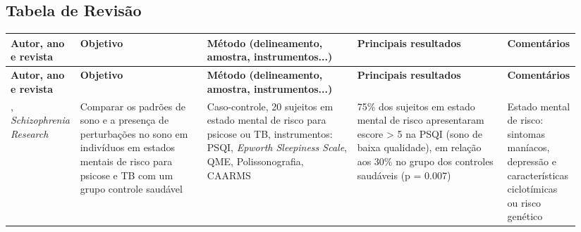 \documentclass[chapter=TITLE,
               oneside,
               12pt,
               a4paper,
               english,
               brazil]{abntex2}    %
\begin{document}
\begin{anexosenv}

    \begin{landscape}

    \chapter{Tabela de Revisão}
    \label{sec:tabelarevisao}
    
            \noindent
            \begin{longtabu} to 
            \toprule
            \textbf{Autor, ano e revista} & \textbf{Objetivo} &
            \textbf{Método (delineamento, amostra, instrumentos...)} &
            \textbf{Principais resultados} & \textbf{Comentários} \\ \midrule
            \endfirsthead
            \toprule
            \textbf{Autor, ano e revista} & \textbf{Objetivo} &
            \textbf{Método (delineamento, amostra, instrumentos...)} &
            \textbf{Principais resultados} & \textbf{Comentários} \\ \midrule
            \endhead

    \textcite{zanini_abnormalities_2015}, \textit{Schizophrenia Research} &
    Comparar os padrões de sono e a presença de perturbações no sono em
    indivíduos em estados mentais de risco para psicose e TB com um grupo
    controle saudável &
    Caso-controle, 20 sujeitos em estado mental de risco para psicose ou TB,
    instrumentos: PSQI, \textit{Epworth Sleepiness Scale}, QME,
    Polissonografia, CAARMS &
    75\% dos sujeitos em estado mental de risco apresentaram escore > 5 na
    PSQI (sono de baixa qualidade), em relação aos 30\% no grupo dos controles
    saudáveis (p = 0.007) &
    Estado mental de risco: sintomas maníacos, depressão e características
    ciclotímicas ou risco genético 
    \\ \midrule


\end{longtabu}
\end{landscape}
\end{anexosenv}
\end{document}

